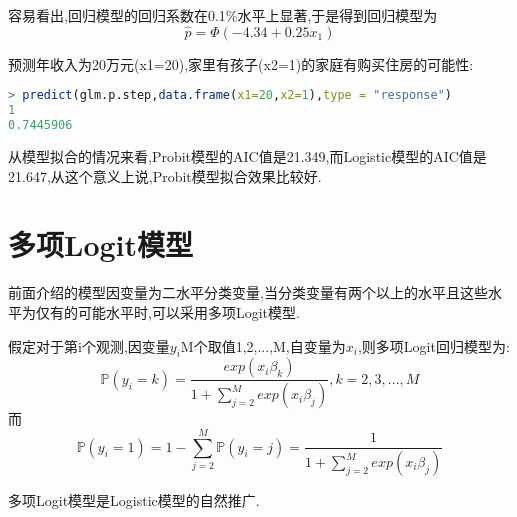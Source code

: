 \documentclass[11pt,a4paper,oneside]{book}
\begin{document}
容易看出,回归模型的回归系数在0.1$ \% $水平上显著,于是得到回归模型为\[\hat{p}=\Phi(-4.34+0.25x_1)\]

预测年收入为20万元(x1=20),家里有孩子(x2=1)的家庭有购买住房的可能性:
\begin{lstlisting}[language=r]
> predict(glm.p.step,data.frame(x1=20,x2=1),type = "response")
1 
0.7445906 
\end{lstlisting}

从模型拟合的情况来看,Probit模型的AIC值是21.349,而Logistic模型的AIC值是21.647,从这个意义上说,Probit模型拟合效果比较好.

\section{多项Logit模型}
前面介绍的模型因变量为二水平分类变量,当分类变量有两个以上的水平且这些水平为仅有的可能水平时,可以采用多项Logit模型.

假定对于第i个观测,因变量$ y_i $M个取值1,2,...,M,自变量为$ x_i $,则多项Logit回归模型为:
\[\mathbb{P}(y_i=k)=\frac{exp(x_i\beta_k)}{1+\sum_{j=2}^{M}exp(x_i\beta_j)},k=2,3,...,M\]
而
\[\mathbb{P}(y_i=1)=1-\sum_{j=2}^{M}\mathbb{P}(y_i=j)=\frac{1}{1+\sum_{j=2}^{M}exp(x_i\beta_j)}\]

多项Logit模型是Logistic模型的自然推广.
\end{document}
